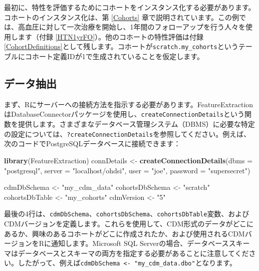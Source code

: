 \documentclass[
  11pt]{book}
\newenvironment{Shaded}{\begin{snugshade}}{\end{snugshade}}
\newcommand{\AttributeTok}[1]{\textcolor[rgb]{0.13,0.29,0.53}{#1}}
\newcommand{\FunctionTok}[1]{\textcolor[rgb]{0.13,0.29,0.53}{\textbf{#1}}}
\newcommand{\NormalTok}[1]{#1}
\newcommand{\OtherTok}[1]{\textcolor[rgb]{0.56,0.35,0.01}{#1}}
\newcommand{\StringTok}[1]{\textcolor[rgb]{0.31,0.60,0.02}{#1}}
\theoremstyle{definition}
\theoremstyle{definition}
\theoremstyle{definition}
\theoremstyle{definition}
\theoremstyle{remark}
\begin{document}
最初に、特性を評価するためにコホートをインスタンス化する必要があります。コホートのインスタンス化は、第 \ref{Cohorts} 章で説明されています。この例では、高血圧に対して一次治療を開始し、1年間のフォローアップを行う人々を使用します（付録 \ref{HTN1yrFO}）。他のコホートの特性評価は付録 \ref{CohortDefinitions}として残します。コホートが\texttt{scratch.my\_cohorts}というテーブルにコホート定義IDが1で生成されていることを仮定します。

\subsection{データ抽出}\label{ux30c7ux30fcux30bfux62bdux51fa}

まず、Rにサーバーへの接続方法を指示する必要があります。FeatureExtractionはDatabaseConnectorパッケージを使用し、\texttt{createConnectionDetails}という関数を提供します。さまざまなデータベース管理システム（DBMS）に必要な特定の設定については、\texttt{?createConnectionDetails}を参照してください。例えば、次のコードでPostgreSQLデータベースに接続できます：

\begin{Shaded}
\begin{Highlighting}[]
\FunctionTok{library}\NormalTok{(FeatureExtraction)}
\NormalTok{connDetails }\OtherTok{\textless{}{-}} \FunctionTok{createConnectionDetails}\NormalTok{(}\AttributeTok{dbms =} \StringTok{"postgresql"}\NormalTok{,}
                                       \AttributeTok{server =} \StringTok{"localhost/ohdsi"}\NormalTok{,}
                                       \AttributeTok{user =} \StringTok{"joe"}\NormalTok{,}
                                       \AttributeTok{password =} \StringTok{"supersecret"}\NormalTok{)}

\NormalTok{cdmDbSchema }\OtherTok{\textless{}{-}} \StringTok{"my\_cdm\_data"}
\NormalTok{cohortsDbSchema }\OtherTok{\textless{}{-}} \StringTok{"scratch"}
\NormalTok{cohortsDbTable }\OtherTok{\textless{}{-}} \StringTok{"my\_cohorts"}
\NormalTok{cdmVersion }\OtherTok{\textless{}{-}} \StringTok{"5"}
\end{Highlighting}
\end{Shaded}

最後の4行は、\texttt{cdmDbSchema}、\texttt{cohortsDbSchema}、\texttt{cohortsDbTable}変数、およびCDMバージョンを定義します。これらを使用して、CDM形式のデータがどこにあるか、興味のあるコホートがどこに作成されたか、および使用されるCDMバージョンをRに通知します。Microsoft SQL Serverの場合、データベーススキーマはデータベースとスキーマの両方を指定する必要があることに注意してください。したがって、例えば\texttt{cdmDbSchema\ \textless{}-\ "my\_cdm\_data.dbo"}となります。
\end{document}

